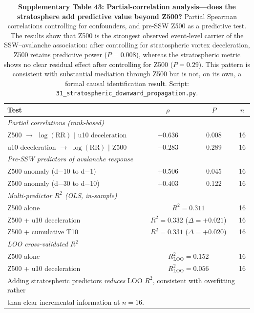 \documentclass[11pt,letterpaper]{article}
\begin{document}
\begin{table}[!ht]
\centering
\caption{\textbf{Supplementary Table 43: Partial-correlation analysis---does the stratosphere add predictive value beyond Z500?} Partial Spearman correlations controlling for confounders, and pre-SSW Z500 as a predictive test. The results show that Z500 is the strongest observed event-level carrier of the SSW--avalanche association: after controlling for stratospheric vortex deceleration, Z500 retains predictive power ($P = 0.008$), whereas the stratospheric metric shows no clear residual effect after controlling for Z500 ($P = 0.29$). This pattern is consistent with substantial mediation through Z500 but is not, on its own, a formal causal identification result. Script: \texttt{31\_stratospheric\_downward\_propagation.py}.}
\label{tab:mediation}
\small
\begin{tabular}{lccc}
\toprule
Test & $\rho$ & $P$ & $n$ \\
\midrule
\multicolumn{4}{l}{\textit{Partial correlations (rank-based)}} \\
Z500 $\to$ $\log(\mathrm{RR})$ $|$ u10 deceleration & $+0.636$ & 0.008 & 16 \\
u10 deceleration $\to$ $\log(\mathrm{RR})$ $|$ Z500 & $-0.283$ & 0.289 & 16 \\
\midrule
\multicolumn{4}{l}{\textit{Pre-SSW predictors of avalanche response}} \\
Z500 anomaly (d$-$10 to d$-$1) & $+0.506$ & 0.045 & 16 \\
Z500 anomaly (d$-$30 to d$-$10) & $+0.403$ & 0.122 & 16 \\
\midrule
\multicolumn{4}{l}{\textit{Multi-predictor $R^2$ (OLS, in-sample)}} \\
Z500 alone & \multicolumn{2}{c}{$R^2 = 0.311$} & 16 \\
Z500 + u10 deceleration & \multicolumn{2}{c}{$R^2 = 0.332$ ($\Delta = +0.021$)} & 16 \\
Z500 + cumulative T10 & \multicolumn{2}{c}{$R^2 = 0.331$ ($\Delta = +0.020$)} & 16 \\
\midrule
\multicolumn{4}{l}{\textit{LOO cross-validated $R^2$}} \\
Z500 alone & \multicolumn{2}{c}{$R^2_{\mathrm{LOO}} = 0.152$} & 16 \\
Z500 + u10 deceleration & \multicolumn{2}{c}{$R^2_{\mathrm{LOO}} = 0.056$} & 16 \\
\bottomrule
\multicolumn{4}{l}{\footnotesize Adding stratospheric predictors \textit{reduces} LOO $R^2$, consistent with overfitting rather} \\
\multicolumn{4}{l}{\footnotesize than clear incremental information at $n = 16$.} \\
\end{tabular}
\end{table}
\end{document}

